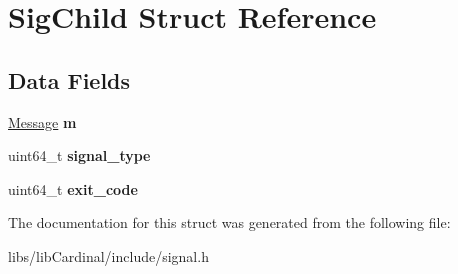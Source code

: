 \hypertarget{structSigChild}{}\section{Sig\+Child Struct Reference}
\label{structSigChild}
\subsection*{Data Fields}
\begin{DoxyCompactItemize}
\item 
\hyperlink{structMessage}{Message} {\bfseries m}\hypertarget{structSigChild_ad07fd3017cbaffb60fc4c5fb70c084f0}{}\label{structSigChild_ad07fd3017cbaffb60fc4c5fb70c084f0}

\item 
uint64\+\_\+t {\bfseries signal\+\_\+type}\hypertarget{structSigChild_aad2eb0d1e2b1093da77b55d061285809}{}\label{structSigChild_aad2eb0d1e2b1093da77b55d061285809}

\item 
uint64\+\_\+t {\bfseries exit\+\_\+code}\hypertarget{structSigChild_a7e9828ed585a825e52f9f3504e69de51}{}\label{structSigChild_a7e9828ed585a825e52f9f3504e69de51}

\end{DoxyCompactItemize}


The documentation for this struct was generated from the following file\+:\begin{DoxyCompactItemize}
\item 
libs/lib\+Cardinal/include/signal.\+h\end{DoxyCompactItemize}
